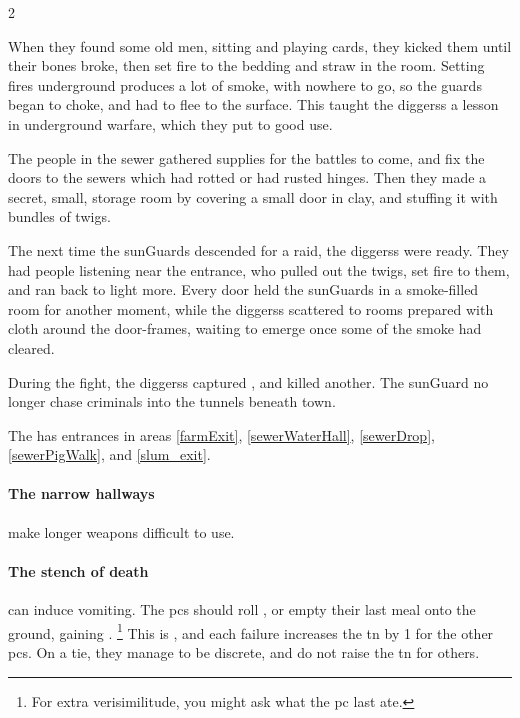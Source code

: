 \begin{multicols}{2}
\begin{exampletext}
  When they found some old men, sitting and playing cards, they kicked them until their bones broke, then set fire to the bedding and straw in the room.
  Setting fires underground produces a lot of smoke, with nowhere to go, so the guards began to choke, and had to flee to the surface.
  This taught the \glspl{diggers} a lesson in underground warfare, which they put to good use.

  The people in the sewer gathered supplies for the battles to come, and fix the doors to the sewers which had rotted or had rusted hinges.
  Then they made a secret, small, storage room by covering a small door in clay, and stuffing it with bundles of twigs.

  The next time the \glspl{sunGuard} descended for a raid, the \glspl{diggers} were ready.
  They had people listening near the entrance, who pulled out the twigs, set fire to them, and ran back to light more.
  Every door held the \glspl{sunGuard} in a smoke-filled room for another moment, while the \glspl{diggers} scattered to rooms prepared with cloth around the door-frames, waiting to emerge once some of the smoke had cleared.

  During the fight, the \glspl{diggers} captured , and killed another.
  The \gls{sunGuard} no longer chase criminals into the tunnels beneath \gls{town}.
\end{exampletext}

The  has entrances in \glspl{area} \ref{farmExit}, \ref{sewerWaterHall}, \ref{sewerDrop}, \ref{sewerPigWalk}, and \ref{slum_exit}.

\paragraph{The narrow hallways}
make longer weapons difficult to use.%

\paragraph{The stench of death}
can induce vomiting.
The \glspl{pc} should roll , or empty their last meal onto the ground, gaining .%
\footnote{For extra verisimilitude, you might ask what the \gls{pc} last ate.}
This is , and each failure increases the \gls{tn} by 1 for the other \glspl{pc}.
On a tie, they manage to be discrete, and do not raise the \gls{tn} for others.



\end{multicols}
